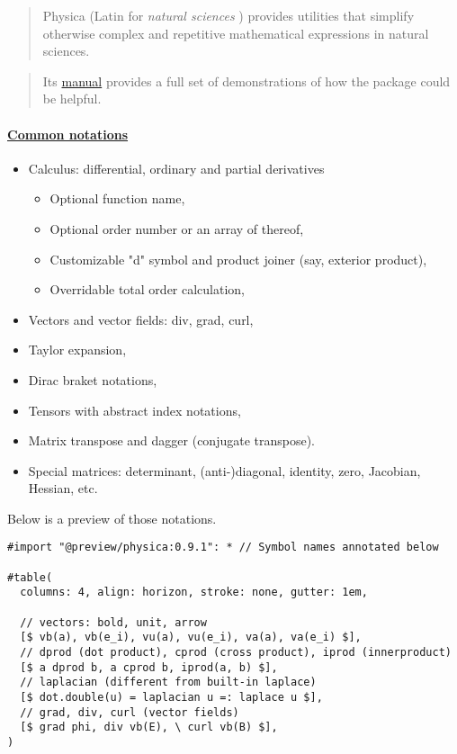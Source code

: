 \begin{quote}
Physica (Latin for \emph{natural sciences} ) provides utilities that
simplify otherwise complex and repetitive mathematical expressions in
natural sciences.
\end{quote}

\begin{quote}
Its
\href{https://github.com/Leedehai/typst-physics/blob/master/physica-manual.pdf}{manual}
provides a full set of demonstrations of how the package could be
helpful.
\end{quote}

\paragraph{\texorpdfstring{\hyperref[common-notations]{Common
notations}}{Common notations}}\label{common-notations}

\begin{itemize}
\tightlist
\item
  Calculus: differential, ordinary and partial derivatives

  \begin{itemize}
  \tightlist
  \item
    Optional function name,
  \item
    Optional order number or an array of thereof,
  \item
    Customizable "d" symbol and product joiner (say, exterior product),
  \item
    Overridable total order calculation,
  \end{itemize}
\item
  Vectors and vector fields: div, grad, curl,
\item
  Taylor expansion,
\item
  Dirac braket notations,
\item
  Tensors with abstract index notations,
\item
  Matrix transpose and dagger (conjugate transpose).
\item
  Special matrices: determinant, (anti-)diagonal, identity, zero,
  Jacobian, Hessian, etc.
\end{itemize}

Below is a preview of those notations.

\begin{verbatim}
#import "@preview/physica:0.9.1": * // Symbol names annotated below

#table(
  columns: 4, align: horizon, stroke: none, gutter: 1em,

  // vectors: bold, unit, arrow
  [$ vb(a), vb(e_i), vu(a), vu(e_i), va(a), va(e_i) $],
  // dprod (dot product), cprod (cross product), iprod (innerproduct)
  [$ a dprod b, a cprod b, iprod(a, b) $],
  // laplacian (different from built-in laplace)
  [$ dot.double(u) = laplacian u =: laplace u $],
  // grad, div, curl (vector fields)
  [$ grad phi, div vb(E), \ curl vb(B) $],
)
\end{verbatim}

